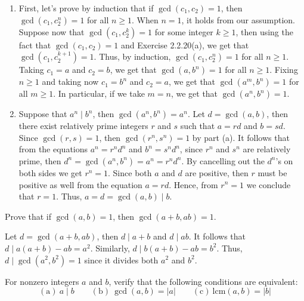 \begin{solution}
    \begin{enumerate}
        \item First, let's prove by induction that if $\gcd(c_1, c_2) = 1$, then $\gcd(c_1,c_2^n) = 1$ for all $n \geq 1$. When $n = 1$, it holds from our assumption. Suppose now that $\gcd(c_1, c_2^k) = 1$ for some integer $k \geq 1$, then using the fact that $\gcd(c_1,c_2) = 1$ and Exercise 2.2.20(a), we get that $\gcd(c_1,c_2^{k+1}) = 1$. Thus, by induction, $\gcd(c_1,c_2^n) = 1$ for all $n \geq 1$. Taking $c_1 = a$ and $c_2 = b$, we get that $\gcd(a, b^n) = 1$ for all $n \geq 1$. Fixing $n \geq 1$ and taking now $c_1 = b^n$ and $c_2 = a$, we get that $\gcd(a^m, b^n) = 1$ for all $m \geq 1$. In particular, if we take $m = n$, we get that $\gcd(a^n, b^n) = 1$.
        \item Suppose that $a^n \mid b^n$, then $\gcd(a^n, b^n) = a^n$. Let $d = \gcd(a,b)$, then there exist relatively prime integers $r$ and $s$ such that $a = rd$ and $b = sd$. Since $\gcd(r, s) = 1$, then $\gcd(r^n, s^n) = 1$ by part (a). It follows that from the equations $a^n = r^n d^n$ and $b^n = s^n d^n$, since $r^n$ and $s^n$ are relatively prime, then $d^n = \gcd(a^n, b^n) = a^n = r^n d^n$. By cancelling out the $d^n$'s on both sides we get $r^n = 1$. Since both $a$ and $d$ are positive, then $r$ must be positive as well from the equation $a = rd$. Hence, from $r^n = 1$ we conclude that $r = 1$. Thus, $a = d = \gcd(a,b) \mid b$.
    \end{enumerate}
\end{solution}

\begin{exercise}
    Prove that if $\gcd(a,b) = 1$, then $\gcd(a + b, ab) = 1$. \\
\end{exercise}

\begin{solution}
    Let $d = \gcd(a + b, ab)$, then $d \mid a+b$ and $d \mid ab$. It follows that $d \mid a(a+b) - ab = a^2$. Similarly, $d \mid b(a+b) - ab = b^2$. Thus, $d \mid \gcd(a^2, b^2) = 1$ since it divides both $a^2$ and $b^2$.\\
\end{solution}

\begin{exercise}
    For nonzero integers $a$ and $b$, verify that the following conditions are equivalent:
    $$(\text{a}) \ a \mid b \qquad (\text{b}) \ \gcd(a,b) = |a| \qquad (\text{c}) \ \text{lcm}(a,b) = |b|$$
\end{exercise}

